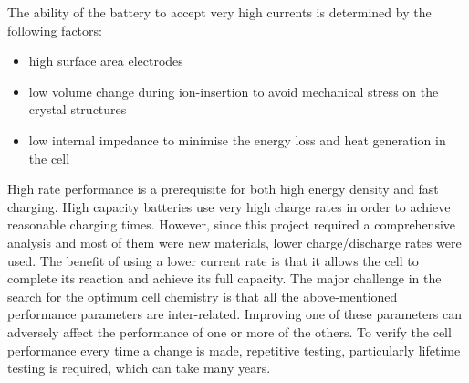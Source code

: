 The ability of the battery to accept very high currents is determined by the following factors:
\begin{itemize}
    \item high surface area electrodes
    \item low volume change during ion-insertion to avoid mechanical stress on the crystal structures
    \item low internal impedance to minimise the energy loss and heat generation in the cell
\end{itemize}

High rate performance is a prerequisite for both high energy density and fast charging. High capacity batteries use very high charge rates in order to achieve reasonable charging times. However, since this project required a comprehensive analysis and most of them were new materials, lower charge/discharge rates were used. The benefit of using a lower current rate is that it allows the cell to complete its reaction and achieve its full capacity.  
The major challenge in the search for the optimum cell chemistry is that all the above-mentioned performance parameters are inter-related. Improving one of these parameters can adversely affect the performance of one or more of the others. To verify the cell performance every time a change is made, repetitive testing, particularly lifetime testing is required, which can take many years.





















